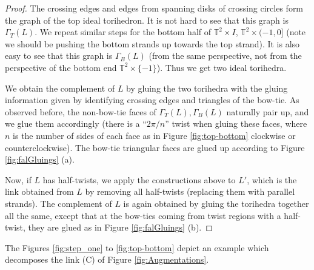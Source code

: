 \documentclass[11pt]{amsart}
\newcommand{\figref}[1]{Figure \ref{#1}}
\newcommand{\torus}{{\mathbb{T}^2}}
\theoremstyle{plain}
\theoremstyle{definition}
\begin{document}
\begin{proof}
The crossing edges and edges from spanning disks of crossing circles
form the graph of the top ideal torihedron.
It is not hard to see that this graph is $\Gamma_T(L)$.
We repeat similar steps for the bottom half of $\torus \times I$,
$\torus \times (-1,0]$
(note we should be pushing the bottom strands up towards the top strand).
It is also easy to see that this graph is $\Gamma_B(L)$
(from the same perspective, not from the perspective of the bottom end
$\torus \times \{-1\}$).
Thus we get two ideal torihedra.


We obtain the complement of $L$ by gluing the two torihedra with the gluing
information given by identifying crossing edges and triangles of the bow-tie.
As observed before, the non-bow-tie faces of $\Gamma_T(L),\Gamma_B(L)$
naturally pair up, and we glue them accordingly
(there is a ``$2\pi/n$'' twist when gluing these faces,
where $n$ is the number of sides of each face as in Figure
\ref{fig:top-bottom} clockwise or counterclockwise).
The bow-tie triangular faces are glued up according to
\figref{fig:falGluings} (a).


Now, if $L$ has half-twists,
we apply the constructions above to $L'$,
which is the link obtained from $L$ by removing all half-twists
(replacing them with parallel strands).
The complement of $L$ is again obtained by
gluing the torihedra together all the same,
except that at the bow-ties coming from twist regions with a half-twist,
they are glued as in Figure \ref{fig:falGluings} (b).


\end{proof}




The Figures \ref{fig:step_one} to \ref{fig:top-bottom}
depict an example which decomposes the link (C) of Figure
\ref{fig:Augmentations}. 
\end{document}
